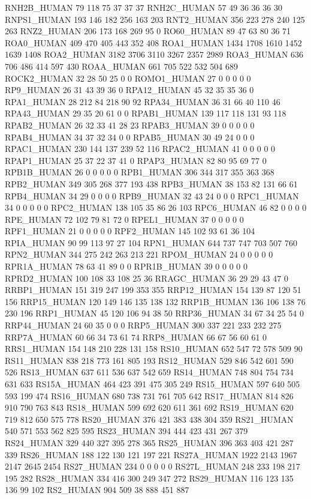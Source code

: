 RNH2B_HUMAN	79	118	75	37	37	37
RNH2C_HUMAN	57	49	36	36	36	30
RNPS1_HUMAN	193	146	182	256	163	203
RNT2_HUMAN	356	223	278	240	125	263
RNZ2_HUMAN	206	173	168	269	95	0
RO60_HUMAN	89	47	63	80	36	71
ROA0_HUMAN	409	470	405	443	352	408
ROA1_HUMAN	1434	1708	1610	1452	1639	1408
ROA2_HUMAN	3182	3706	3110	3267	2357	2989
ROA3_HUMAN	636	706	486	414	597	430
ROAA_HUMAN	661	705	522	532	504	689
ROCK2_HUMAN	32	28	50	25	0	0
ROMO1_HUMAN	27	0	0	0	0	0
RP9_HUMAN	26	31	43	39	36	0
RPA12_HUMAN	45	32	35	35	36	0
RPA1_HUMAN	28	212	84	218	90	92
RPA34_HUMAN	36	31	66	40	110	46
RPA43_HUMAN	29	35	20	61	0	0
RPAB1_HUMAN	139	117	118	131	93	118
RPAB2_HUMAN	26	32	33	41	28	23
RPAB3_HUMAN	39	0	0	0	0	0
RPAB4_HUMAN	34	37	32	34	0	0
RPAB5_HUMAN	30	49	24	0	0	0
RPAC1_HUMAN	230	144	137	239	52	116
RPAC2_HUMAN	41	0	0	0	0	0
RPAP1_HUMAN	25	37	22	37	41	0
RPAP3_HUMAN	82	80	95	69	77	0
RPB1B_HUMAN	26	0	0	0	0	0
RPB1_HUMAN	306	344	317	355	363	368
RPB2_HUMAN	349	305	268	377	193	438
RPB3_HUMAN	38	153	82	131	66	61
RPB4_HUMAN	34	29	0	0	0	0
RPB9_HUMAN	32	43	24	0	0	0
RPC1_HUMAN	34	0	0	0	0	0
RPC2_HUMAN	138	105	35	86	26	103
RPC6_HUMAN	46	82	0	0	0	0
RPE_HUMAN	72	102	79	81	72	0
RPEL1_HUMAN	37	0	0	0	0	0
RPF1_HUMAN	21	0	0	0	0	0
RPF2_HUMAN	145	102	93	61	36	104
RPIA_HUMAN	90	99	113	97	27	104
RPN1_HUMAN	644	737	747	703	507	760
RPN2_HUMAN	344	275	242	263	213	221
RPOM_HUMAN	24	0	0	0	0	0
RPR1A_HUMAN	78	63	41	89	0	0
RPR1B_HUMAN	39	0	0	0	0	0
RPRD2_HUMAN	100	108	33	108	25	36
RRAGC_HUMAN	36	29	29	43	47	0
RRBP1_HUMAN	151	319	247	199	353	355
RRP12_HUMAN	154	139	87	120	51	156
RRP15_HUMAN	120	149	146	135	138	132
RRP1B_HUMAN	136	106	138	76	230	196
RRP1_HUMAN	45	120	106	94	38	50
RRP36_HUMAN	34	67	34	25	54	0
RRP44_HUMAN	24	60	35	0	0	0
RRP5_HUMAN	300	337	221	233	232	275
RRP7A_HUMAN	60	66	34	73	61	74
RRP8_HUMAN	66	67	56	60	61	0
RRS1_HUMAN	154	148	210	228	131	158
RS10_HUMAN	652	547	72	578	509	90
RS11_HUMAN	838	218	773	161	805	193
RS12_HUMAN	529	846	542	601	590	526
RS13_HUMAN	637	611	536	637	542	659
RS14_HUMAN	748	804	754	734	631	633
RS15A_HUMAN	464	423	391	475	305	249
RS15_HUMAN	597	640	505	593	199	474
RS16_HUMAN	680	738	731	761	705	642
RS17_HUMAN	814	826	910	790	763	843
RS18_HUMAN	599	692	620	611	361	692
RS19_HUMAN	620	719	812	650	575	778
RS20_HUMAN	376	421	383	438	304	359
RS21_HUMAN	540	571	553	562	825	595
RS23_HUMAN	394	444	423	431	267	379
RS24_HUMAN	329	440	327	395	278	365
RS25_HUMAN	396	363	403	421	287	339
RS26_HUMAN	188	122	130	121	197	221
RS27A_HUMAN	1922	2143	1967	2147	2645	2454
RS27_HUMAN	234	0	0	0	0	0
RS27L_HUMAN	248	233	198	217	195	282
RS28_HUMAN	334	416	300	249	347	272
RS29_HUMAN	116	123	135	136	99	102
RS2_HUMAN	904	509	38	888	451	887

